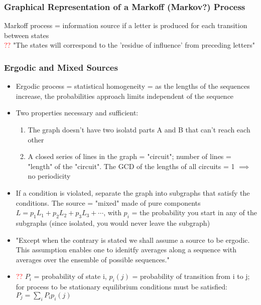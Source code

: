 \documentclass[leqno,twocolumn]{article}
\begin{document}
\subsubsection{Graphical Representation of a Markoff (Markov?) Process}
Markoff process = information source if a letter is produced for each transition between states\\
\textcolor{red}{??} "The states will correspond to the 'residue of influence' from preceding letters"

\subsubsection{Ergodic and Mixed Sources}
\begin{itemize}
\item Ergodic process = statistical homogeneity = as the lengths of the sequences increase, the probabilities approach limits independent of the sequence
\item Two properties necessary and sufficient:
\begin{enumerate}
\item The graph doesn't have two isolatd parts A and B that can't reach each other
\item A closed series of lines in the graph = "circuit"; number of lines = "length" of the "circuit". The GCD of the lengths of all circuits = 1 $\implies$ no periodicity
\end{enumerate}
\item If a condition is violated, separate the graph into subgraphs that satisfy the conditions. The source = "mixed" made of pure components $L = p_1L_1 + p_2L_2 + p_3L_3 + \cdots$, with $p_i$ = the probability you start in any of the subgraphs (since isolated, you would never leave the subgraph)
\item "Except when the contrary is stated we shall assume a source to be ergodic. This assumption enables one to idenitfy averages along a sequence with averages over the ensemble of possible sequences."
\item \textcolor{red}{??} $P_i$ = probability of state i, $p_i(j)$ = probability of transition from i to j; for process to be stationary equilibrium conditions must be satisfied: $P_j = \sum_i P_ip_i(j)$
\end{itemize}
\end{document}
